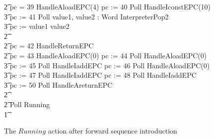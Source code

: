 \begin{figure}[t!]
\begin{circus}
    \t2 {} \circelse pc = 39 \circthen HandleAloadEPC(4) \circseq pc := 40 \circseq Poll \circseq HandleIconstEPC(10) \circseq \\
    \t3 pc := 41 \circseq Poll \circseq \circvar value1, value2 : Word \circspot InterpreterPop2 \circseq \\
    \t3 pc := \IF value1 \leq value2   \\
    \t2 {} \cdots {} \\
    \t2 {} \circelse pc = 42 \circthen HandleReturnEPC \\
    \t2 {} \circelse pc = 43 \circthen HandleAloadEPC(0) \circseq pc := 44 \circseq Poll \circseq HandleAloadEPC(0) \circseq \\
    \t3 pc := 45 \circseq Poll \circseq HandleIaddEPC \circseq pc := 46 \circseq Poll \circseq HandleAloadEPC(0) \circseq \\
    \t3 pc := 47 \circseq Poll \circseq HandleIaddEPC \circseq pc := 48 \circseq Poll \circseq HandleIaddEPC \circseq \\
    \t3 pc := 50 \circseq Poll \circseq HandleAreturnEPC \\
    \t2 {} \cdots {} \\
    \t2 \circfi \circseq Poll \circseq Running \\
    \t1 \circfi
  \end{circus}
  \caption{The $Running$ action after forward sequence introduction}
  \label{forward-sequence-introduction-example-figure}
\end{figure}

